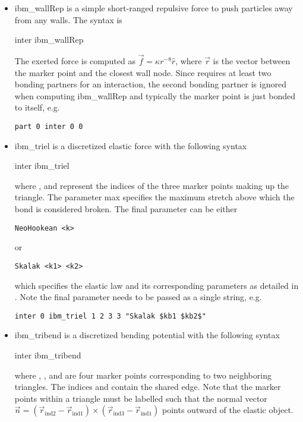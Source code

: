 \begin{itemize}
\item ibm\_wallRep is a simple short-ranged repulsive force to push particles away from any walls. The syntax is
\begin{essyntax}
  inter  ibm_wallRep \var{\kappa}
  \begin{features}
  \end{features}
\end{essyntax}
The exerted force is computed as $\vec{f} = \kappa r^{-8} \hat{r}$, where $\vec{r}$ is the vector between the marker point and the closest wall node. Since \es requires at least two bonding partners for an interaction, the second bonding partner is ignored when computing ibm\_wallRep and typically the marker point is just bonded to itself, e.g.
\begin{verbatim}
part 0 inter 0 0
\end{verbatim}

\item ibm\_triel is a discretized elastic force with the following syntax
\begin{essyntax}
  inter  ibm_triel     
  \begin{features}
  \end{features}
\end{essyntax}
where ,  and  represent the indices of
the three marker points making up the triangle. The parameter max
specifies the maximum stretch above which the bond is considered
broken. The final parameter  can be either
\begin{verbatim}
NeoHookean <k>
\end{verbatim}
or
\begin{verbatim}
Skalak <k1> <k2>
\end{verbatim}
which specifies the elastic law and its corresponding parameters as detailed in \cite{KruegerThesis}. Note the final parameter needs to be passed as a single string, e.g.
\begin{verbatim}
inter 0 ibm_triel 1 2 3 3 "Skalak $kb1 $kb2$"
\end{verbatim}

\item ibm\_tribend is a discretized bending potential with the following syntax
\begin{essyntax}
  inter  ibm_tribend   
     
  \begin{features}
  \end{features}
\end{essyntax}
where , ,  and  are four marker points corresponding to two neighboring triangles. The indices  and  contain the shared edge. Note that the marker points within a triangle must be labelled such that the normal vector $\vec{n} = (\vec{r}_\text{ind2} - \vec{r}_\text{ind1}) \times (\vec{r}_\text{ind3} - \vec{r}_\text{ind1})$ points outward of the elastic object. 


\end{itemize}
